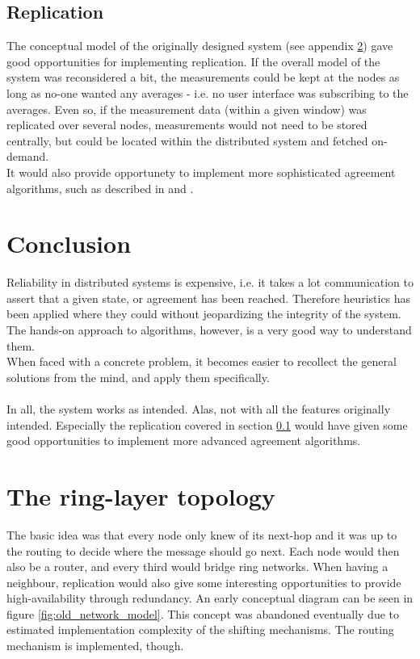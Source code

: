 \documentclass[10pt,a4paper]{article}
\begin{document}
\subsection{Replication}
\label{sec:discussion:replication}
The conceptual model of the originally designed system (see appendix \ref{sec:ring_layer_topology}) gave good opportunities for implementing replication. If the overall model of the system was reconsidered a bit, the measurements could be kept at the nodes as long as no-one wanted any averages - i.e. no user interface was subscribing to the averages. Even so, if the measurement data (within a given window) was replicated over several nodes, measurements would not need to be stored centrally, but could be located within the distributed system and fetched on-demand.\\
It would also provide opportunety to implement more sophisticated agreement algorithms, such as described in \cite{Liris-5968} and \cite{clement2009making}.

\section{Conclusion}
Reliability in distributed systems is expensive, i.e. it takes a lot communication to assert that a given state, or agreement has been reached. Therefore heuristics has been applied where they could without jeopardizing the integrity of the system. The hands-on approach to algorithms, however, is a very good way to understand them.\\
When faced with a concrete problem, it becomes easier to recollect the general solutions from the mind, and apply them specifically.\\\\
In all, the system works as intended. Alas, not with all the features originally intended. Especially the replication covered in section \ref{sec:discussion:replication} would have given some good opportunities to implement more advanced agreement algorithms.

\newpage
\appendix

\section{The ring-layer topology}
\label{sec:ring_layer_topology}
The basic idea was that every node only knew of its next-hop and it was up to the routing to decide where the message should go next. Each node would then also be a router, and every third would bridge ring networks. When having a neighbour, replication would also give some interesting opportunities to provide high-availability through redundancy. An early conceptual diagram can be seen in figure \ref{fig:old_network_model}.
This concept was abandoned eventually due to estimated implementation complexity of the shifting mechanisms. The routing mechanism is implemented, though.
\end{document}
